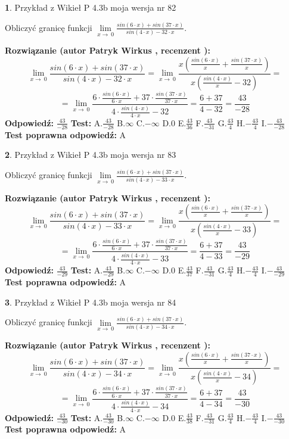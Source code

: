 \documentclass[12pt, a4paper]{article}
\theoremstyle{definition} %
\newtheorem{zad}{}
\newcommand{\zadStart}[1]{\begin{zad}#1\newline}
\newcommand{\zadStop}{\end{zad}}
\newcommand{\rozwStart}[2]{\noindent \textbf{Rozwiązanie (autor #1 , recenzent #2): }\newline}
\newcommand{\rozwStop}{\newline}
\newcommand{\odpStart}{\noindent \textbf{Odpowiedź:}\newline}
\newcommand{\odpStop}{\newline}
\newcommand{\testStart}{\noindent \textbf{Test:}\newline}
\newcommand{\testStop}{\newline}
\newcommand{\kluczStart}{\noindent \textbf{Test poprawna odpowiedź:}\newline}
\newcommand{\kluczStop}{\newline}
\begin{document}
\zadStart{Przykład z Wikieł P 4.3b moja wersja nr 82}


Obliczyć granicę funkcji $\lim\limits_{x\to\ 0}\frac{sin(6 \cdot x)+sin(37 \cdot x)}{sin(4 \cdot x)-32 \cdot x}$.
\zadStop
\rozwStart{Patryk Wirkus}{}
$$\lim\limits_{x\to\ 0}\frac{sin(6 \cdot x)+sin(37 \cdot x)}{sin(4 \cdot x)-32 \cdot x}=\lim\limits_{x\to\ 0}\frac{x(\frac{sin(6 \cdot x)}{x}+\frac{sin(37 \cdot x)}{x})}{x(\frac{sin(4 \cdot x)}{x}-32)}=$$
$$=\lim\limits_{x\to\ 0}\frac{6 \cdot \frac{sin(6 \cdot x)}{6 \cdot x}+37 \cdot \frac{sin(37 \cdot x)}{37 \cdot x}}{4 \cdot \frac{sin(4 \cdot x)}{4 \cdot x}-32}=\frac{6+37}{4-32} = \frac{43}{-28}$$
\rozwStop
\odpStart
$\frac{43}{-28}$
\odpStop
\testStart
A.$\frac{43}{-28}$
B.$\infty$
C.$-\infty$
D.$0$
E.$\frac{43}{36}$
F.$\frac{43}{-31}$
G.$\frac{43}{4}$
H.$-\frac{43}{4}$
I.$-\frac{43}{-28}$
\testStop
\kluczStart
A
\kluczStop



\zadStart{Przykład z Wikieł P 4.3b moja wersja nr 83}


Obliczyć granicę funkcji $\lim\limits_{x\to\ 0}\frac{sin(6 \cdot x)+sin(37 \cdot x)}{sin(4 \cdot x)-33 \cdot x}$.
\zadStop
\rozwStart{Patryk Wirkus}{}
$$\lim\limits_{x\to\ 0}\frac{sin(6 \cdot x)+sin(37 \cdot x)}{sin(4 \cdot x)-33 \cdot x}=\lim\limits_{x\to\ 0}\frac{x(\frac{sin(6 \cdot x)}{x}+\frac{sin(37 \cdot x)}{x})}{x(\frac{sin(4 \cdot x)}{x}-33)}=$$
$$=\lim\limits_{x\to\ 0}\frac{6 \cdot \frac{sin(6 \cdot x)}{6 \cdot x}+37 \cdot \frac{sin(37 \cdot x)}{37 \cdot x}}{4 \cdot \frac{sin(4 \cdot x)}{4 \cdot x}-33}=\frac{6+37}{4-33} = \frac{43}{-29}$$
\rozwStop
\odpStart
$\frac{43}{-29}$
\odpStop
\testStart
A.$\frac{43}{-29}$
B.$\infty$
C.$-\infty$
D.$0$
E.$\frac{43}{37}$
F.$\frac{43}{-31}$
G.$\frac{43}{4}$
H.$-\frac{43}{4}$
I.$-\frac{43}{-29}$
\testStop
\kluczStart
A
\kluczStop



\zadStart{Przykład z Wikieł P 4.3b moja wersja nr 84}


Obliczyć granicę funkcji $\lim\limits_{x\to\ 0}\frac{sin(6 \cdot x)+sin(37 \cdot x)}{sin(4 \cdot x)-34 \cdot x}$.
\zadStop
\rozwStart{Patryk Wirkus}{}
$$\lim\limits_{x\to\ 0}\frac{sin(6 \cdot x)+sin(37 \cdot x)}{sin(4 \cdot x)-34 \cdot x}=\lim\limits_{x\to\ 0}\frac{x(\frac{sin(6 \cdot x)}{x}+\frac{sin(37 \cdot x)}{x})}{x(\frac{sin(4 \cdot x)}{x}-34)}=$$
$$=\lim\limits_{x\to\ 0}\frac{6 \cdot \frac{sin(6 \cdot x)}{6 \cdot x}+37 \cdot \frac{sin(37 \cdot x)}{37 \cdot x}}{4 \cdot \frac{sin(4 \cdot x)}{4 \cdot x}-34}=\frac{6+37}{4-34} = \frac{43}{-30}$$
\rozwStop
\odpStart
$\frac{43}{-30}$
\odpStop
\testStart
A.$\frac{43}{-30}$
B.$\infty$
C.$-\infty$
D.$0$
E.$\frac{43}{38}$
F.$\frac{43}{-31}$
G.$\frac{43}{4}$
H.$-\frac{43}{4}$
I.$-\frac{43}{-30}$
\testStop
\kluczStart
A
\kluczStop
\end{document}
